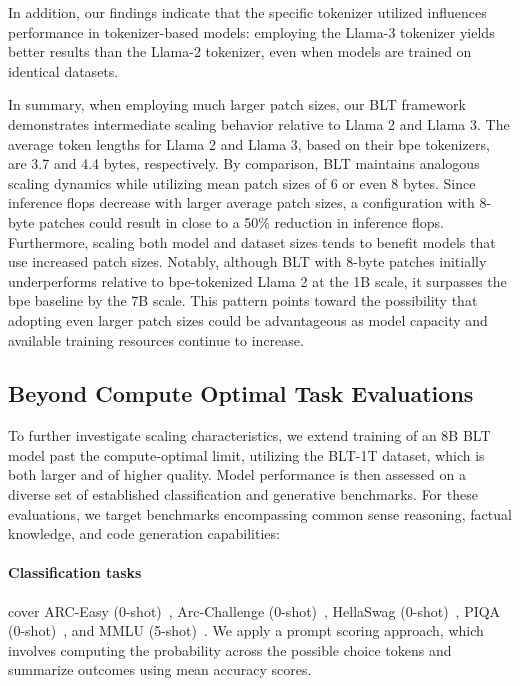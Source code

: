 In addition, our findings indicate that the specific tokenizer utilized influences performance in tokenizer-based models: employing the Llama-3 tokenizer yields better results than the Llama-2 tokenizer, even when models are trained on identical datasets.

In summary, when employing much larger patch sizes, our {\textsc BLT} framework demonstrates intermediate scaling behavior relative to Llama 2 and Llama 3. The average token lengths for Llama 2 and Llama 3, based on their bpe tokenizers, are 3.7 and 4.4 bytes, respectively. By comparison, {\textsc BLT} maintains analogous scaling dynamics while utilizing mean patch sizes of 6 or even 8 bytes. Since inference flops decrease with larger average patch sizes, a configuration with 8-byte patches could result in close to a 50\% reduction in inference flops. Furthermore, scaling both model and dataset sizes tends to benefit models that use increased patch sizes. Notably, although {\textsc BLT} with 8-byte patches initially underperforms relative to bpe-tokenized Llama 2 at the 1B scale, it surpasses the bpe baseline by the 7B scale. This pattern points toward the possibility that adopting even larger patch sizes could be advantageous as model capacity and available training resources continue to increase.

\subsection{Beyond Compute Optimal Task Evaluations}
\label{section:evals}
To further investigate scaling characteristics, we extend training of an 8B {\textsc BLT} model past the compute-optimal limit, utilizing the {\textsc BLT}-1T dataset, which is both larger and of higher quality. Model performance is then assessed on a diverse set of established classification and generative benchmarks. For these evaluations, we target benchmarks encompassing common sense reasoning, factual knowledge, and code generation capabilities:
\paragraph{Classification tasks} cover ARC-Easy (0-shot)~\citep{Eval_ARC}, Arc-Challenge (0-shot)~\citep{Eval_ARC}, HellaSwag (0-shot)~\citep{Eval_hellaswag}, PIQA (0-shot)~\citep{Eval_piqa}, and MMLU (5-shot)~\citep{hendrycks2020measuring}. We apply a prompt scoring approach, which involves computing the probability across the possible choice tokens and summarize outcomes using mean accuracy scores.
